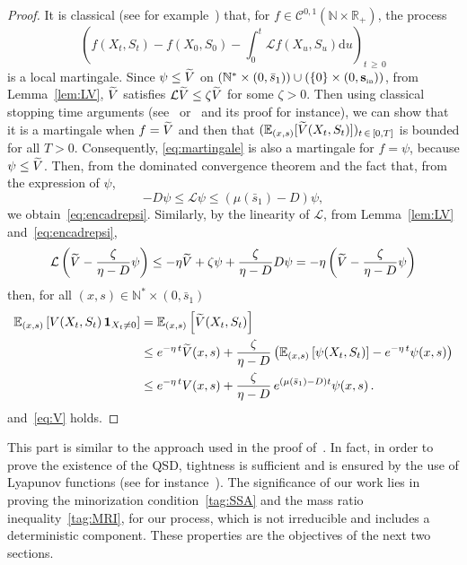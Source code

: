 \documentclass[AHL,Unicode,longabstracts,published]{cedram}
\newcommand{\RR}{\mathbb{R}}
\newcommand{\NN}{\mathbb{N}}
\newcommand{\EE}{\mathbb{E}}
\newcommand{\clL}{\mathcal{L}}
\newcommand{\clC}{\mathcal{C}}
\newcommand{\Sin}{{\mathbf s}_{\textrm{\tiny\rm in}}}
\newcommand{\dif}{\mathrm{d}}
\newcommand{\1}{\mathbf{1}}
\let\oldtilde\tilde
\renewcommand*{\tilde}[1]{\mathchoice{\widetilde{#1}}{\widetilde{#1}}{\oldtilde{#1}}{\oldtilde{#1}}}
\begin{document}
\begin{proof}
It is classical (see for example~\cite[Section~4]{CF15}) that, for $f\in\clC^{0,1}(\NN\times \RR_+)$, the process
\begin{equation}\label{eq:martingale}
\left(f(X_t,S_t) - f(X_0,S_0) - \int_0^t \clL f(X_u,S_u) \dif u \right)_{t\,\geq\,0}
\end{equation}
is a local martingale. Since $\psi \leq \tilde V$ on $(\NN^*\times(0,\bar s_1)) \cup(\{0\}\times (0,\Sin))$, from Lemma~\ref{lem:LV}, $\tilde V$ satisfies $\clL\tilde V\leq \zeta \tilde V $ for some $\zeta>0$. Then using classical stopping time arguments (see~\cite[Section~6.2.]{BCGM} or~\cite[Theorem~2.1]{MTIII} and its proof for instance), we can show that it is a martingale when $f=\tilde V$ and then that $(\EE_{(x,s)}[\tilde V(X_t,S_t)])_{t\,\in\,[0,T]}$ is bounded for all $T>0$. Consequently, \eqref{eq:martingale} is also a martingale for $f=\psi$, because $\psi \leq \tilde V$. Then, from the dominated convergence theorem and the fact that, from the expression of $\psi$,
\[
-D \psi \leq \clL \psi \leq (\mu(\bar s_1) -D)\psi,
\]
we obtain~\eqref{eq:encadrepsi}. Similarly, by the linearity of $\clL$, from Lemma~\ref{lem:LV} and~\eqref{eq:encadrepsi},
\[
\clL\left(\tilde V-\frac{\zeta}{\eta-D}\psi\right)
\leq -\eta \tilde V + \zeta \psi + \frac{\zeta}{\eta-D}D\psi = -\eta\left(\tilde V-\frac{\zeta}{\eta-D}\psi\right)
\]
then, for all $(x,s)\in \NN^*\times (0,\bar s_1)$
\begin{align*}
\EE_{(x,s)}\left[V(X_t,S_t) \, \1_{X_t\neq 0}\right] &= \EE_{(x,s)}\left[\tilde V(X_t,S_t)\right]
\\
&\leq e^{-\eta\,t}\tilde V(x,s) + \frac{\zeta}{\eta-D}\left(\EE_{(x,s)}\left[\psi(X_t,S_t)\right]-e^{-\eta\,t}\psi(x,s)\right)
\\
&\leq e^{-\eta\,t} V(x,s)+\frac{\zeta}{\eta-D}\,e^{(\mu(\bar s_1)-D) t}\psi(x,s)\,.
\end{align*}
and~\eqref{eq:V} holds.
\end{proof}


This part is similar to the approach used in the proof of~\cite[Theorem~4.1]{CMMS}. In fact, in order to prove the existence of the QSD, tightness is sufficient and is ensured by the use of Lyapunov functions (see for instance~\cite[Theorem~4.2]{CMMS2011}). The significance of our work lies in proving the minorization condition~\eqref{tag:SSA} and the mass ratio inequality~\eqref{tag:MRI}, for our process, which is not irreducible and includes a deterministic component. These properties are the objectives of the next two sections.
\end{document}
